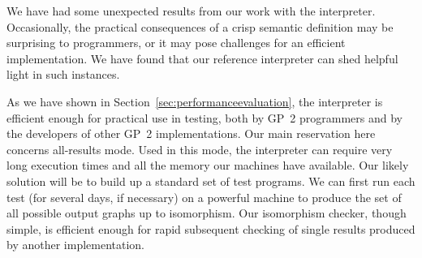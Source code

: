 We have had some unexpected results from our work with the interpreter.
Occasionally, the practical consequences of a crisp semantic definition
may be surprising to programmers, or it may pose challenges for an efficient
implementation.
We have found that our reference interpreter can shed helpful light in
such instances.

As we have shown in Section~\ref{sec:performanceevaluation}, the interpreter is efficient enough for practical use in testing,
both by GP~2 programmers and by the developers of other GP~2 implementations.
Our main reservation here concerns all-results mode.
Used in this mode, the interpreter can require very long execution times and all the memory our machines have available.
Our likely solution will be to build up a standard set of test programs.
We can first run each test (for several days, if necessary)
on a powerful machine to produce the set of all possible output graphs up to isomorphism.
Our isomorphism checker, though simple, is efficient enough for rapid
subsequent checking of single results produced by another implementation.

